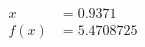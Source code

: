 \documentclass[preview]{standalone}
\begin{document}
\begin{align*}
x &= 0.9371\\f(x) &= 5.4708725
\end{align*}
\end{document}
